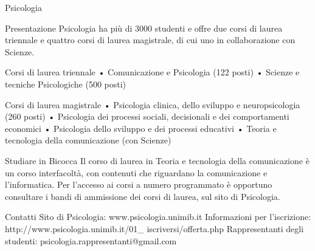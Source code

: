 Psicologia

Presentazione
Psicologia ha più di 3000 studenti e offre due corsi di laurea triennale e quattro corsi di laurea magistrale, di cui uno in collaborazione con Scienze. 

Corsi di laurea triennale
      • Comunicazione e Psicologia (122 posti) 
      • Scienze e tecniche Psicologiche (500 posti) 

Corsi di laurea magistrale
      • Psicologia clinica, dello sviluppo e neuropsicologia (260 posti) 
      • Psicologia dei processi sociali, decisionali e dei comportamenti economici 
      • Psicologia dello sviluppo e dei processi educativi 
      • Teoria e tecnologia della comunicazione (con Scienze)

Studiare in Bicocca
Il corso di laurea in Teoria e tecnologia della comunicazione è un corso interfacoltà, con contenuti che riguardano la comunicazione e l'informatica.  Per l'accesso ai corsi a numero programmato è opportuno consultare i bandi di ammissione dei corsi di laurea, sul sito di Psicologia. 

Contatti
Sito di Psicologia: www.psicologia.unimib.it 
Informazioni per l'iscrizione: http://www.psicologia.unimib.it/01\_ iscriversi/offerta.php 
Rappresentanti degli studenti: psicologia.rappresentanti@gmail.com 
